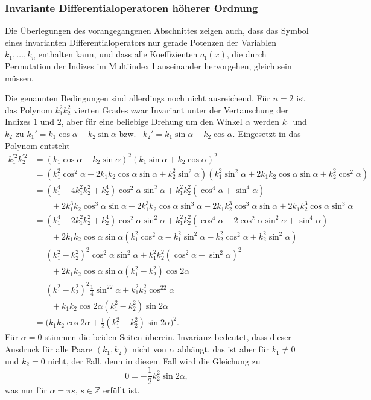 %
%
\subsubsection{Invariante Differentialoperatoren höherer Ordnung}
Die Überlegungen des vorangegangenen Abschnittes zeigen auch,
dass das Symbol eines invarianten Differentialoperators nur gerade
Potenzen der Variablen $k_1,\dots,k_n$ enthalten kann, und
dass alle Koeffizienten $a_{\bm{l}}(x)$, die durch Permutation der
Indizes im Multiindex $\bm{l}$ auseinander hervorgehen, gleich
sein müssen.

Die genannten Bedingungen sind allerdings noch nicht ausreichend.
Für $n=2$ ist das Polynom $k_1^2k_2^2$ vierten Grades zwar Invariant
unter der Vertauschung der Indizes $1$ und $2$, aber für eine
beliebige Drehung um den Winkel $\alpha$ werden $k_1$ und $k_2$
zu
$k_1' = k_1\cos\alpha -k_2\sin\alpha$
bzw.~
$k_2' = k_1\sin\alpha +k_2\cos\alpha$.
Eingesetzt in das Polynom entsteht
\begin{align*}
k_1^{\prime 2}
k_2^{\prime 2}
&=
(k_1\cos\alpha -k_2\sin\alpha)^2
(k_1\sin\alpha +k_2\cos\alpha)^2
\\
&=
(k_1^2\cos^2\alpha -2k_1k_2\cos\alpha\sin\alpha +k_2^2\sin^2\alpha)
(k_1^2\sin^2\alpha +2k_1k_2\cos\alpha\sin\alpha +k_2^2\cos^2\alpha)
\\
&=
(k_1^4-4k_1^2k_2^2+k_2^4)\cos^2\alpha\sin^2\alpha
+
k_1^2k_2^2(\cos^4\alpha+\sin^4\alpha)
\\
&\qquad
+
2k_1^3k_2\cos^3\alpha\sin\alpha
-
2k_1^3k_2\cos\alpha\sin^3\alpha
-
2k_1k_2^3\cos^3\alpha\sin\alpha
+
2k_1k_2^3\cos\alpha\sin^3\alpha
\\
&=
(k_1^4-2k_1^2k_2^2+k_2^4)\cos^2\alpha\sin^2\alpha
+
k_1^2k_2^2(\cos^4\alpha-2\cos^2\alpha\sin^2\alpha+\sin^4\alpha)
\\
&\qquad
+
2k_1k_2\cos\alpha\sin\alpha(
k_1^2\cos^2\alpha
-
k_1^2\sin^2\alpha
-
k_2^2\cos^2\alpha
+
k_2^2\sin^2\alpha
)
\\
&=
(k_1^2-k_2^2)^2
\cos^2\alpha\sin^2\alpha
+
k_1^2k_2^2
(\cos^2\alpha-\sin^2\alpha)^2
\\
&\qquad
+
2k_1k_2
\cos\alpha\sin\alpha
(k_1^2-k_2^2)\cos2\alpha
\\
&=
(k_1^2-k_2^2)^2
\frac14\sin^22\alpha
+
k_1^2k_2^2
\cos^22\alpha
\\
&\qquad
+
k_1k_2
\cos2\alpha
(k_1^2-k_2^2)
\sin2\alpha
\\
&=
\bigl(k_1k_2\cos2\alpha + {\textstyle\frac12}(k_1^2-k_2^2)\sin2\alpha\bigr)^2.
\end{align*}
Für $\alpha=0$ stimmen die beiden Seiten überein.
Invarianz bedeutet, dass dieser Ausdruck für alle Paare $(k_1,k_2)$
nicht von $\alpha$ abhängt, das ist aber für $k_1\ne0$ und $k_2=0$ nicht,
der Fall, denn in diesem Fall wird die Gleichung zu
\[
0
=
-
\frac12 k_2^2\sin2\alpha,
\]
was nur für $\alpha=\pi s$, $s\in\mathbb{Z}$ erfüllt ist.

